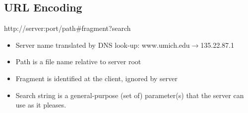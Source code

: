 \subsection{URL Encoding}
\begin{center}
	http://server:port/path\#fragment?search
\end{center}
\begin{itemize}
	\item Server name translated by DNS look-up: www.umich.edu$\to$135.22.87.1
	\item Path is a file name relative to server root
	\item Fragment is identified at the client, ignored by server
	\item Search string is a general-purpose (set of) parameter(s) that the server can use as it pleases.
\end{itemize}